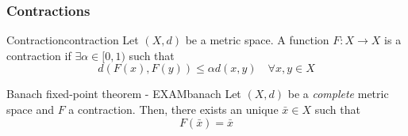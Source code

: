\documentclass[12pt]{extarticle}
\begin{document}
\subsubsection{Contractions}

\begin{definition}{Contraction}{contraction}
    Let $(X, d)$ be a metric space.
    A function $F: X \to X$ is a contraction if $\exists \alpha \in [0, 1)$
    such that
    \begin{equation}
        d(F(x), F(y)) \leq \alpha d(x, y) \quad \forall x, y \in X
    \end{equation}
\end{definition}

\begin{theorem}{Banach fixed-point theorem - EXAM}{banach}
    Let $(X, d)$ be a \emph{complete} metric space and $F$ a contraction.
    Then, there exists an unique $\bar x \in X$ such that
    \begin{equation}
        F(\bar x) = \bar x
    \end{equation}
\end{theorem}
\end{document}
